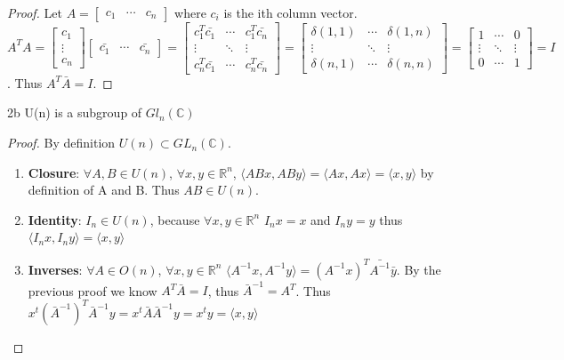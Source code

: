 \documentclass{article}
\newcommand{\C}{\mathbb{C}}
\newcommand{\R}{\mathbb{R}}
\newcommand{\angles}[1]{\langle{#1}\rangle}
\begin{document}
\begin{proof}
    Let $A = \begin{bmatrix}
        c_1 & \cdots & c_n
    \end{bmatrix}$ where $c_i$ is the ith column vector. $A^T A = \begin{bmatrix}
        c_1 \\ \vdots \\ c_n
    \end{bmatrix} \begin{bmatrix}
        \bar{c_1} & \cdots & \bar{c_n}
    \end{bmatrix} = \begin{bmatrix}
        c_1^T \bar{c_1} & \cdots & c_1^T \bar{c_n} \\
        \vdots & \ddots & \vdots \\
        c_n^T \bar{c_1} & \cdots & c_n^T \bar{c_n}
    \end{bmatrix} = \begin{bmatrix}
        \delta(1, 1) & \cdots & \delta(1, n) \\
        \vdots & \ddots & \vdots \\
        \delta(n, 1) & \cdots & \delta(n, n)
    \end{bmatrix} = \begin{bmatrix}
        1 & \cdots & 0 \\
        \vdots & \ddots & \vdots \\
        0 & \cdots & 1
    \end{bmatrix} = I$. Thus $A^T \bar{A} = I$.
\end{proof}

\begin{claim}{2b}
    U(n) is a subgroup of $Gl_n(\C)$
\end{claim}
\begin{proof}
    By definition $U(n) \subset GL_n(\C)$.

    \begin{enumerate}{}
        \item \textbf{Closure}: $\forall A, B \in U(n)$, $\forall x, y \in \R^n$, $\angles{ABx, ABy} = \angles{Ax, Ax} = \angles{x, y}$ by definition of A and B. Thus $AB \in U(n)$.
        \item \textbf{Identity}: $I_n \in U(n)$, because $\forall x, y \in \R^n$ $I_n x = x$ and $I_n y = y$ thus $\angles{I_n x, I_n y} = \angles{x, y}$
        \item \textbf{Inverses}: $\forall A \in O(n)$, $\forall x, y \in \R^n$ $\angles{A^{-1}x, A^{-1}y } = (A^{-1}x)^T \bar{A^{-1}} \bar{y}$. By the previous proof we know $A^T \bar{A} = I$, thus $\bar{A}^{-1} = A^T$. Thus $x^t(\bar{A}^{-1})^T \bar{A}^{-1}y = x^t \bar{A} \bar{A}^{-1}y = x^t y = \angles{x, y}$
    \end{enumerate}
\end{proof}
\end{document}
